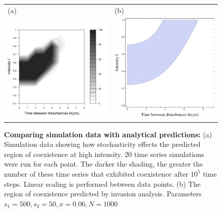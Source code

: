 \documentclass[a4paper]{article}
\begin{document}
\begin{figure}\begin{tabular}{ll}
(a)&(b)\\
 \includegraphics[width=2.5in]{simcoexist.pdf}& \includegraphics[width=2.5in]{hockeyTd.pdf}\end{tabular}
   \caption[Comparing simulation data with analytical predictions]{\textbf{Comparing simulation data with analytical predictions:} (a) Simulation data showing how stochasticity effects the predicted region of coexistence at high intensity. 20 time series simulations were run for each point. The darker the shading, the greater the number of these time series that exhibited coexistence after $10^5$ time steps. Linear scaling is performed between data points. (b) The region of coexistence predicted by invasion analysis. Parameters $s_1=500,s_2=50,x=0.06,N=1000$}
 \label{fig:simulationdata}
\end{figure}
   
\end{document}
